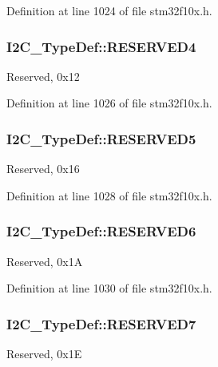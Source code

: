 Definition at line 1024 of file stm32f10x.\-h.

\hypertarget{struct_i2_c___type_def_a05a1a3482d9534ba9ef976e3277040f0}{
\subsubsection[{R\-E\-S\-E\-R\-V\-E\-D4}]{ I2\-C\-\_\-\-Type\-Def\-::\-R\-E\-S\-E\-R\-V\-E\-D4}}\label{struct_i2_c___type_def_a05a1a3482d9534ba9ef976e3277040f0}
Reserved, 0x12 

Definition at line 1026 of file stm32f10x.\-h.

\hypertarget{struct_i2_c___type_def_ae736412dcff4daa38bfa8bf8628df316}{
\subsubsection[{R\-E\-S\-E\-R\-V\-E\-D5}]{ I2\-C\-\_\-\-Type\-Def\-::\-R\-E\-S\-E\-R\-V\-E\-D5}}\label{struct_i2_c___type_def_ae736412dcff4daa38bfa8bf8628df316}
Reserved, 0x16 

Definition at line 1028 of file stm32f10x.\-h.

\hypertarget{struct_i2_c___type_def_aaf1b319262f53669f49e244d94955a60}{
\subsubsection[{R\-E\-S\-E\-R\-V\-E\-D6}]{ I2\-C\-\_\-\-Type\-Def\-::\-R\-E\-S\-E\-R\-V\-E\-D6}}\label{struct_i2_c___type_def_aaf1b319262f53669f49e244d94955a60}
Reserved, 0x1\-A 

Definition at line 1030 of file stm32f10x.\-h.

\hypertarget{struct_i2_c___type_def_a0f398bdcc3f24e7547c3cb9343111fd0}{
\subsubsection[{R\-E\-S\-E\-R\-V\-E\-D7}]{ I2\-C\-\_\-\-Type\-Def\-::\-R\-E\-S\-E\-R\-V\-E\-D7}}\label{struct_i2_c___type_def_a0f398bdcc3f24e7547c3cb9343111fd0}
Reserved, 0x1\-E 

